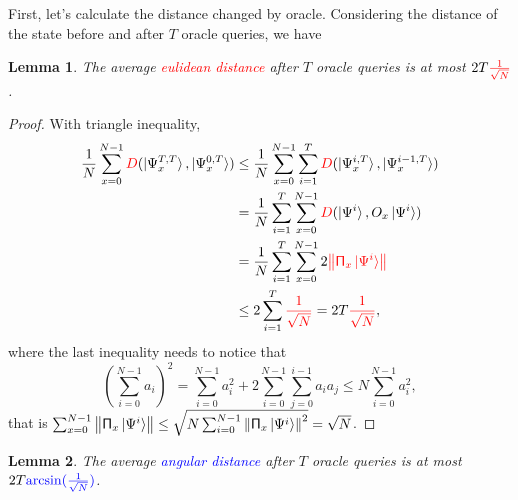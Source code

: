 \documentclass[a4paper,10pt]{article}
\newtheorem{lemma}{Lemma}[subsection]
\numberwithin{equation}{subsection}
\begin{document}
First, let's calculate the distance changed by oracle. Considering the distance of the state before and after $T$ oracle queries, we have
\begin{lemma}
    The average \textcolor{red}{eulidean distance} after $T$ oracle queries is at most $2T\textcolor{red}{\frac{1}{\sqrt{N}}}$.
\end{lemma}
\begin{proof}
    With triangle inequality,
    \begin{equation}
        \begin{split}
            \frac{1}{N}\sum_{x=0}^{N-1}\textcolor{red}{D}(\ket{\Psi_{x}^{T,T}},\ket{\Psi_{x}^{0,T}})
             & \leq \frac{1}{N}\sum_{x=0}^{N-1}\sum_{i=1}^{T}\textcolor{red}{D}(\ket{\Psi_{x}^{i,T}},\ket{\Psi_{x}^{i-1,T}}) \\
             & = \frac{1}{N}\sum_{i=1}^{T}\sum_{x=0}^{N-1}\textcolor{red}{D}(\ket{\Psi^{i}},O_{x}\ket{\Psi^{i}})             \\
             & = \frac{1}{N}\sum_{i=1}^{T}\sum_{x=0}^{N-1}2\textcolor{red}{\left\| \mathsf{\Pi}_{x}\ket{\Psi^{i}}\right\|}   \\
             & \leq 2\sum_{i=1}^{T}\textcolor{red}{\frac{1}{\sqrt{N}}} = 2T\textcolor{red}{\frac{1}{\sqrt{N}}},
        \end{split}
    \end{equation}
    where the last inequality needs to notice that
    \begin{equation}\label{Cauchy-Schwarz}
        \left(\sum_{i=0}^{N-1}a_{i}\right)^{2}=\sum_{i=0}^{N-1}a_{i}^{2}+2\sum_{i=0}^{N-1}\sum_{j=0}^{i-1}a_{i}a_{j}\leq N\sum_{i=0}^{N-1}a_{i}^{2},
    \end{equation}
    that is $\sum_{x=0}^{N-1}\left\|\mathsf{\Pi}_{x}\ket{\Psi^{i}}\right\|\leq \sqrt{N\sum_{i=0}^{N-1}\left\|\mathsf{\Pi}_{x}\ket{\Psi^{i}}\right\|^{2}}=\sqrt{N}$.
\end{proof}
\begin{lemma}
    The average \textcolor{blue}{angular distance} after $T$ oracle queries is at most $2T\textcolor{blue}{\arcsin(\frac{1}{\sqrt{N}})}$.
\end{lemma}
\end{document}
